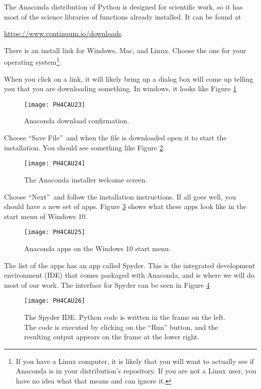 The Anaconda distribution of Python is designed for scientific work, so it
has most of the science libraries of functions already installed. It can be
found at 

\href{https://www.continuum.io/downloads}{https://www.continuum.io/downloads}. 

There is an install link for
Windows, Mac, and Linux. Choose the one for your operating system\footnote{%
If you have a Linux computer, it is likely that you will want to actually
see if Anaconda is in your distribution's repository. If you are not a Linux
user, you have no idea what that means and can ignore it.}.

When you click on a link, it will likely bring up
a dialog box will come up telling you
that you are downloading something. In windows, it looks like
Figure \ref{fig:download_dialog}
\begin{figure}[htbp!]
\centering
\texttt{[image: PH4CAU23]}
    \caption[Anaconda download confirmation]{Anaconda download confirmation.}
    \label{fig:download_dialog}
\end{figure}

Choose \textquotedblleft Save File\textquotedblright\ and when the file is
downloaded open it to start the installation. You should see something like
Figure \ref{fig:welcome_screen}.
\begin{figure}[htbp!]
    \centering
\texttt{[image: PH4CAU24]}
    \caption[The Anaconda installer welcome screen]
    {The Anaconda installer welcome screen.}
    \label{fig:welcome_screen}
\end{figure}

Choose \textquotedblleft Next\textquotedblright\ and follow the installation
instructions. If all goes well, you should have a new set of apps. Figure
\ref{fig:anaconda_menu} shows what these apps look like in the start menu
of Windows 10.
\begin{figure}[htbp!]
    \centering
\texttt{[image: PH4CAU25]}
    \caption[Anaconda apps on the Windows 10 start menu]{Anaconda apps on
    the Windows 10 start menu.}
    \label{fig:anaconda_menu}
\end{figure}

The list of the apps has an app called Spyder. This is the integrated
development environment (IDE) that comes packaged with Anaconda, and is where
we will do most of our work. The interface for Spyder can be seen in 
Figure \ref{fig:spyder}
\begin{figure}[htbp!]
    \centering
\texttt{[image: PH4CAU26]}
    \caption[The Spyder IDE]{The Spyder IDE. Python code is written in the
    frame on the left. The code is executed by clicking on the ``Run'' button,
    and the resulting output appears on the frame at the lower right.}
    \label{fig:spyder}
\end{figure}

